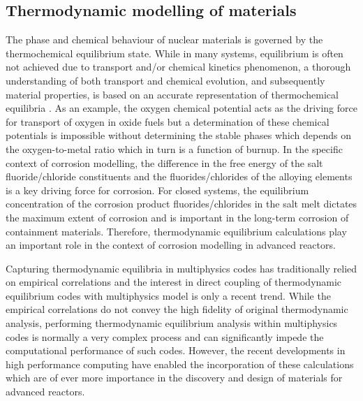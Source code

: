 	\subsection{Thermodynamic modelling of materials}
	The phase and chemical behaviour of nuclear materials is governed by the thermochemical equilibrium state. While in many systems, equilibrium is often not achieved due to transport and/or chemical kinetics phenomenon, a thorough understanding of both transport and chemical evolution, and subsequently material properties, is  based on an accurate representation of thermochemical equilibria \cite{Devanathan:2010aa}. As an example, the oxygen chemical potential acts as the driving force for transport of oxygen in oxide fuels but a determination of these chemical potentials is impossible without determining the stable phases which depends on the oxygen-to-metal ratio which in turn is a function of burnup.  In the specific context of corrosion modelling, the difference in the free energy of the salt fluoride/chloride constituents and the fluorides/chlorides of the alloying elements is a key driving force for corrosion. For closed systems, the equilibrium concentration of the corrosion product fluorides/chlorides in the salt melt dictates the maximum extent of corrosion and is important in the long-term corrosion of containment materials. Therefore, thermodynamic equilibrium calculations play an important role in the context of corrosion modelling in advanced reactors.
	
	Capturing thermodynamic equilibria in multiphysics codes has traditionally relied on empirical correlations and the interest in direct coupling of thermodynamic equilibrium codes with multiphysics model is only a recent trend. While the empirical correlations do not convey the high fidelity of original thermodynamic analysis, performing thermodynamic equilibrium analysis within multiphysics codes is normally a very complex process and can significantly impede the computational performance of such codes. However, the recent developments in high performance computing have enabled the incorporation of these calculations which are of ever more importance in the discovery and design of materials for advanced reactors. 
	
